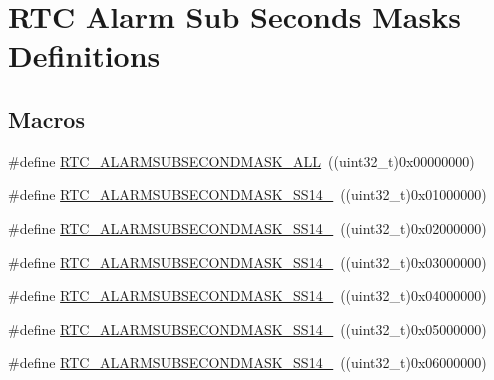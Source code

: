 \hypertarget{group___r_t_c___alarm___sub___seconds___masks___definitions}{}\section{R\+TC Alarm Sub Seconds Masks Definitions}
\label{group___r_t_c___alarm___sub___seconds___masks___definitions}
\subsection*{Macros}
\begin{DoxyCompactItemize}
\item 
\#define \hyperlink{group___r_t_c___alarm___sub___seconds___masks___definitions_gaf96ae2bcfc62e92473372c4510d517d5}{R\+T\+C\+\_\+\+A\+L\+A\+R\+M\+S\+U\+B\+S\+E\+C\+O\+N\+D\+M\+A\+S\+K\+\_\+\+A\+LL}~((uint32\+\_\+t)0x00000000)
\item 
\#define \hyperlink{group___r_t_c___alarm___sub___seconds___masks___definitions_ga382ddfaca27c4b547c69878a320aab43}{R\+T\+C\+\_\+\+A\+L\+A\+R\+M\+S\+U\+B\+S\+E\+C\+O\+N\+D\+M\+A\+S\+K\+\_\+\+S\+S14\+\_}~((uint32\+\_\+t)0x01000000)
\item 
\#define \hyperlink{group___r_t_c___alarm___sub___seconds___masks___definitions_gad627f4e6c83537e1d5b8c657f91d6bcf}{R\+T\+C\+\_\+\+A\+L\+A\+R\+M\+S\+U\+B\+S\+E\+C\+O\+N\+D\+M\+A\+S\+K\+\_\+\+S\+S14\+\_}~((uint32\+\_\+t)0x02000000)
\item 
\#define \hyperlink{group___r_t_c___alarm___sub___seconds___masks___definitions_gaeb5fb21c4ef0d54ca1515564563c0487}{R\+T\+C\+\_\+\+A\+L\+A\+R\+M\+S\+U\+B\+S\+E\+C\+O\+N\+D\+M\+A\+S\+K\+\_\+\+S\+S14\+\_}~((uint32\+\_\+t)0x03000000)
\item 
\#define \hyperlink{group___r_t_c___alarm___sub___seconds___masks___definitions_ga6f9b0a78f9723a20b1f94b5581e04194}{R\+T\+C\+\_\+\+A\+L\+A\+R\+M\+S\+U\+B\+S\+E\+C\+O\+N\+D\+M\+A\+S\+K\+\_\+\+S\+S14\+\_}~((uint32\+\_\+t)0x04000000)
\item 
\#define \hyperlink{group___r_t_c___alarm___sub___seconds___masks___definitions_gafc0252b2f8a935811dadd3d6b8ea3574}{R\+T\+C\+\_\+\+A\+L\+A\+R\+M\+S\+U\+B\+S\+E\+C\+O\+N\+D\+M\+A\+S\+K\+\_\+\+S\+S14\+\_}~((uint32\+\_\+t)0x05000000)
\item 
\#define \hyperlink{group___r_t_c___alarm___sub___seconds___masks___definitions_ga60fab8d647e6f8500926a0db2dff94d8}{R\+T\+C\+\_\+\+A\+L\+A\+R\+M\+S\+U\+B\+S\+E\+C\+O\+N\+D\+M\+A\+S\+K\+\_\+\+S\+S14\+\_}~((uint32\+\_\+t)0x06000000)

\end{DoxyCompactItemize}
